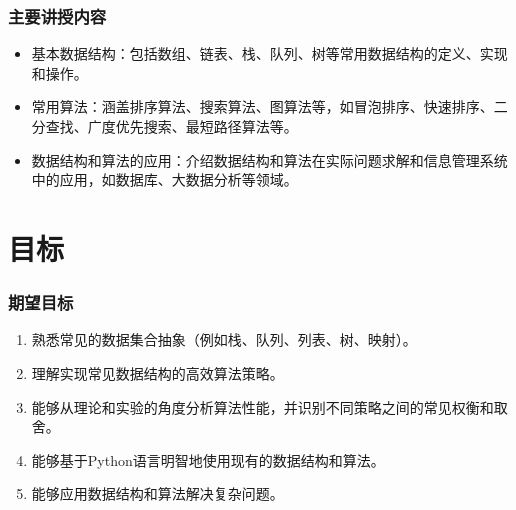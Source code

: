 \documentclass{beamer}
\begin{document}
\begin{frame}
    \frametitle{主要讲授内容}

    \begin{itemize}
        \item 基本数据结构：包括数组、链表、栈、队列、树等常用数据结构的定义、实现和操作。
        \item 常用算法：涵盖排序算法、搜索算法、图算法等，如冒泡排序、快速排序、二分查找、广度优先搜索、最短路径算法等。
        \item 数据结构和算法的应用：介绍数据结构和算法在实际问题求解和信息管理系统中的应用，如数据库、大数据分析等领域。
    \end{itemize}

\end{frame}


\section{目标}

\begin{frame}
    \frametitle{期望目标}

    \begin{enumerate}
        \item 熟悉常见的数据集合抽象（例如栈、队列、列表、树、映射）。
        \item 理解实现常见数据结构的高效算法策略。
        \item 能够从理论和实验的角度分析算法性能，并识别不同策略之间的常见权衡和取舍。
        \item 能够基于Python语言明智地使用现有的数据结构和算法。
        \item 能够应用数据结构和算法解决复杂问题。
    \end{enumerate}

\end{frame}





\backmatter
\end{document}
